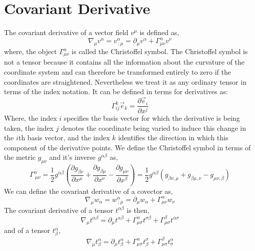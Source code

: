 \section{Covariant Derivative}
The covariant derivative of a vector field $v^{\mu}$ is defined as,
\begin{equation}
\nabla_{\mu} v^{\alpha} = v^{\alpha}_{ \  ; \mu} = \partial_{\mu} v^{\alpha} + \Gamma^{\alpha}_{\mu \nu} v^{\nu}
\end{equation}
where, the object $\Gamma^{\alpha}_{\mu \nu}$ is called the Christoffel symbol. The Christoffel symbol is not a tensor because it contains all the information about the curvature of the coordinate system and can therefore be transformed entirely to zero if the coordinates are straightened. Nevertheless we treat it as any ordinary tensor in terms of the index notation. It can be defined in terms for derivatives as:
\begin{equation}
\Gamma^{k}_{ij}\vec{e}_{k} = \frac{\partial \vec{e}_{i}}{\partial x^{j}}
\end{equation}
Where, the index $i$ specifies the basis vector for which the derivative is being
taken, the index $j$ denotes the coordinate being varied to induce this change
in the $i$th basis vector, and the index $k$ identifies the direction in which this
component of the derivative points. We define the Christoffel symbol in terms of the metric $g_{\mu \nu}$ and it's inverse $g^{\alpha \beta}$ as,
\begin{equation}
\Gamma^{\alpha}_{\ \mu \nu} = \frac{1}{2} g^{\alpha \beta} \left(\frac{\partial g_{\beta \nu}}{\partial x^{\mu}} + \frac{\partial g_{\beta \mu}}{\partial x^{\nu}} - \frac{\partial g_{\mu \nu}}{\partial x^{\beta}}\right) = \frac{1}{2}g^{\alpha \beta} \left(g_{\beta \nu, \mu} + g_{\beta \mu, \nu} - g_{\mu \nu, \beta}\right)
\end{equation}
We can define the covariant derivative of a covector as,
\begin{equation}
\nabla_{\mu} w_{\alpha} = w^{\alpha}_{ \  ; \mu} = \partial_{\mu} w_{\alpha} + \Gamma^{\alpha}_{\mu \nu} w_{\nu}
\end{equation}
The covariant derivative of a tensor $t^{\alpha\beta}$ is then,
\begin{equation}
\nabla_{\mu}t^{\alpha \beta} = \partial_{\mu} t^{\alpha \beta} + \Gamma^{\alpha}_{\mu \sigma}t^{\sigma \beta} + \Gamma^{\beta}_{\mu \sigma}t^{\alpha \sigma }
\end{equation}
and of a tensor $t^{\alpha}_{\beta}$,
\begin{equation}
\nabla_{\mu}t^{\alpha}_{\beta} = \partial_{\mu} t^{\alpha}_{\beta} + \Gamma^{\alpha}_{\mu \sigma}t^{\sigma}_{\beta} + \Gamma^{\beta}_{\mu \sigma}t^{\alpha}_{\sigma}
\end{equation}
